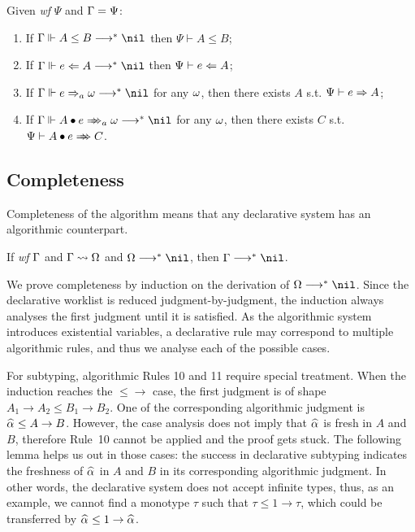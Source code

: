 \begin{corollary}
Given \emph{wf }$\Psi$ and $\Gamma = \Psi$:
\begin{enumerate}
    \item If $\Gm \Vdash A \le B \redto \nil$ then $\Psi \vdash A \le B$;
    \item If $\Gm \Vdash e \Lto A \redto \nil$ then $\Psi \vdash e \Leftarrow A$;
    \item If $\Gm \Vdash e \To_a \jg \redto \nil$ for any $\omega$, then there exists $A$
        s.t. $\Psi \vdash e \Rightarrow A$;
    \item If $\Gm \Vdash \appInfAlg{A}{e} \redto \nil$ for any $\omega$, then there exists $C$
        s.t. $\Psi \vdash \appInf{A}{e}{C}$.
\end{enumerate}
\end{corollary}

\subsection{Completeness}

Completeness of the algorithm means that any declarative system has an algorithmic counterpart.

\begin{theorem}[Completeness]
If \emph{wf }$\Gamma$ and $\Gamma\rightsquigarrow\Omega$ and $\Om\redto\nil$, then $\Gm \redto \nil$.
\label{thm:completeness}
\end{theorem}

We prove completeness by induction on the derivation of $\Om\redto\nil$.
Since the declarative worklist is reduced judgment-by-judgment,
the induction always analyses the first judgment until it is satisfied.
As the algorithmic system introduces existential variables,
a declarative rule may correspond to multiple algorithmic rules,
and thus we analyse each of the possible cases.

For subtyping, algorithmic Rules 10 and 11 require special treatment.
When the induction reaches the $\mathtt{{\le}{\to}}$ case,
the first judgment is of shape $A_1 \to A_2 \le B_1 \to B_2$.
One of the corresponding algorithmic judgment is $\al \le A \to B$.
However, the case analysis does not imply that $\al$ is fresh in $A$ and $B$,
therefore Rule~10 cannot be applied and the proof gets stuck.
The following lemma helps us out in those cases:
the success in declarative subtyping indicates the freshness of $\al$ in $A$ and $B$
in its corresponding algorithmic judgment.
In other words, the declarative system does not accept infinite types,
thus, as an example, we cannot find a monotype $\tau$ such that $\tau\le 1\to \tau$,
which could be transferred by $\al\le 1\to\al$.

